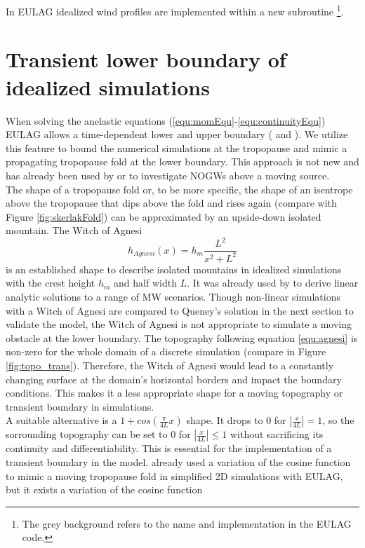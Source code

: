 In EULAG idealized wind profiles are implemented within a new subroutine \footnote[1]{The grey background refers to the name and implementation in the EULAG code.}. 

\section{Transient lower boundary of idealized simulations}
\label{sec:trans-boundary}
When solving the anelastic equations (\ref{equ:momEqu}-\ref{equ:continuityEqu}) EULAG allows a time-dependent lower and upper boundary (\cite[]{prusa_propagation_1996} and \cite[]{wedi_extending_2003}). We utilize this feature to bound the numerical simulations at the tropopause and mimic a propagating tropopause fold at the lower boundary. This approach is not new and has already been used by \textcite[]{pfister_gravity_1993} or \textcite[]{prusa_all-scale_2003} to investigate NOGWs above a moving source. \\
The shape of a tropopause fold or, to be more specific, the shape of an isentrope above the tropopause that dips above the fold and rises again (compare with Figure \ref{fig:skerlakFold}) can be approximated by an upside-down isolated mountain.
The Witch of Agnesi
\begin{equation}
    h_{Agnesi}(x) = h_m \frac{L^2}{x^2+L^2}
    \label{equ:agnesi}
\end{equation}
is an established shape to describe isolated mountains in idealized simulations with the crest height $h_m$ and half width $L$. It was already used by \textcite{queney_problem_1948} to derive linear analytic solutions to a range of MW scenarios. Though non-linear simulations with a Witch of Agnesi are compared to Queney's solution in the next section to validate the model, the Witch of Agnesi is not appropriate to simulate a moving obstacle at the lower boundary. The topography following equation \ref{equ:agnesi} is non-zero for the whole domain of a discrete simulation (compare in Figure \ref{fig:topo_trans}). Therefore, the Witch of Agnesi would lead to a constantly changing surface at the domain's horizontal borders and impact the boundary conditions. This makes it a less appropriate shape for a moving topography or transient boundary in simulations. \\
A suitable alternative is a $1+cos(\frac{\pi}{4L}x)$ shape. It drops to 0 for $|\frac{x}{4L}| = 1$, so the sorrounding topography can be set to 0 for $|\frac{x}{4L}| \leq 1$ without sacrificing its continuity and differentiability. This is essential for the implementation of a transient boundary in the model. \textcite[]{prusa_all-scale_2003} already used a variation of the cosine function to mimic a moving tropopause fold in simplified 2D simulations with EULAG, but it exists a variation of the cosine function 

